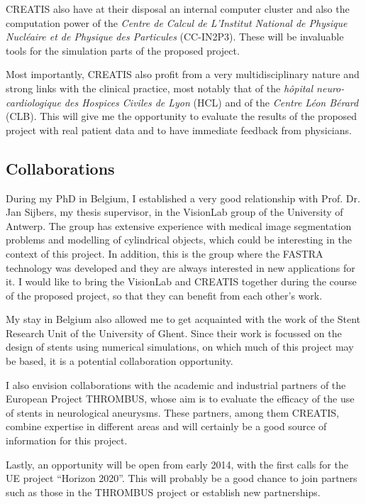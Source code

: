 \documentclass[a4paper]{article}
\begin{document}
CREATIS also have at their disposal an internal computer cluster and also the computation power of the {\it Centre de Calcul de L'Institut National de Physique Nucl\'eaire et de Physique des Particules} (CC-IN2P3). These will be invaluable tools for the simulation parts of the proposed project. 

Most importantly, CREATIS also profit from a very multidisciplinary nature and strong links with the clinical practice, most notably that of the {\it h\^opital neuro-cardiologique des Hospices Civiles de Lyon} (HCL) and of the {\it Centre L\'eon B\'erard} (CLB). This will give me the opportunity to evaluate the results of the proposed project with real patient data and to have immediate feedback from physicians. 

\subsection{Collaborations}

During my PhD in Belgium, I established a very good relationship with Prof. Dr. Jan Sijbers, my thesis supervisor, in the VisionLab group of the University of Antwerp. The group has extensive experience with medical image segmentation problems and modelling of cylindrical objects, which could be interesting in the context of this project. In addition, this is the group where the FASTRA technology was developed and they are always interested in new applications for it. I would like to bring the VisionLab and CREATIS together during the course of the proposed project, so that they can benefit from each other's work.

My stay in Belgium also allowed me to get acquainted with the work of the Stent Research Unit of the University of Ghent. Since their work is focussed on the design of stents using numerical simulations, on which much of this project may be based, it is a potential collaboration opportunity. 

I also envision collaborations with the academic and industrial partners of the European Project THROMBUS, whose aim is to evaluate the efficacy of the use of stents in neurological aneurysms. These partners, among them CREATIS, combine expertise in different areas and will certainly be a good source of information for this project.

Lastly, an opportunity will be open from early 2014, with the first calls for the UE project ``Horizon 2020''. This will probably be a good chance to join partners such as those in the THROMBUS project or establish new partnerships. 
\end{document}
